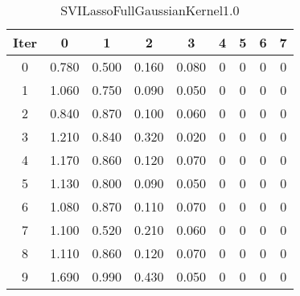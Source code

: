 \begin{table}
	\begin{center}
		\begin{tabular}{|c|c|c|c|c|c|c|c|c|}
			\hline
			Iter & 0 & 1 & 2 & 3 & 4 & 5 & 6 & 7 \\
			\hline
			0 & 0.780 & 0.500 & 0.160 & 0.080 & 0 & 0 & 0 & 0 \\
			\hline
			1 & 1.060 & 0.750 & 0.090 & 0.050 & 0 & 0 & 0 & 0 \\
			\hline
			2 & 0.840 & 0.870 & 0.100 & 0.060 & 0 & 0 & 0 & 0 \\
			\hline
			3 & 1.210 & 0.840 & 0.320 & 0.020 & 0 & 0 & 0 & 0 \\
			\hline
			4 & 1.170 & 0.860 & 0.120 & 0.070 & 0 & 0 & 0 & 0 \\
			\hline
			5 & 1.130 & 0.800 & 0.090 & 0.050 & 0 & 0 & 0 & 0 \\
			\hline
			6 & 1.080 & 0.870 & 0.110 & 0.070 & 0 & 0 & 0 & 0 \\
			\hline
			7 & 1.100 & 0.520 & 0.210 & 0.060 & 0 & 0 & 0 & 0 \\
			\hline
			8 & 1.110 & 0.860 & 0.120 & 0.070 & 0 & 0 & 0 & 0 \\
			\hline
			9 & 1.690 & 0.990 & 0.430 & 0.050 & 0 & 0 & 0 & 0 \\
			\hline
		\end{tabular}
	\end{center}
	\caption{SVILassoFullGaussianKernel1.0}
\end{table}